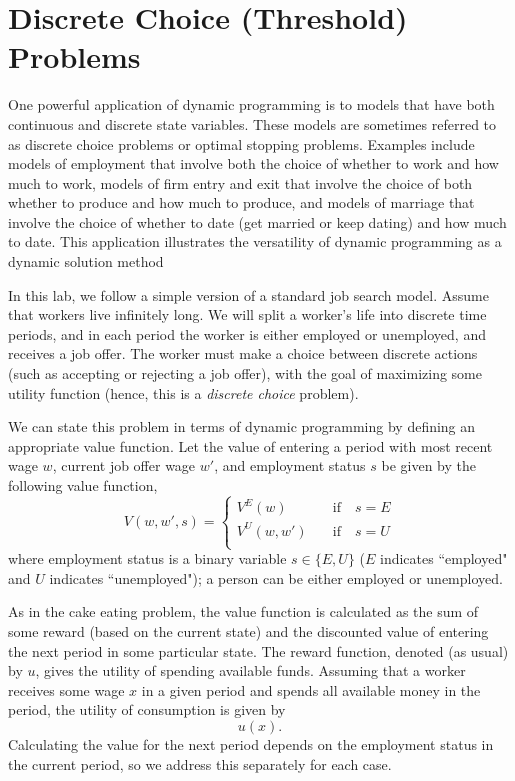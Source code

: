\section*{Discrete Choice (Threshold) Problems}\label{SecDiscrChoice}

One powerful application of dynamic programming is
to models that have both continuous and discrete state variables. These models are sometimes referred to as
discrete choice problems or optimal stopping problems.  Examples include models of employment that involve both
the choice of whether to work and how much to work, models of firm entry and exit that involve the choice of both
whether to produce and how much to produce, and models of marriage that involve the choice of whether to date
(get married or keep dating) and how much to date.
This application illustrates the versatility of dynamic programming as a dynamic solution method

In this lab, we follow a simple version of a standard job search model.
Assume that workers live infinitely long.
We will split a worker's life into discrete time periods, and in each period the worker is either
employed or unemployed, and receives a job offer. The worker must make a choice between discrete actions
(such as accepting or rejecting a job offer), with the goal of maximizing some utility function (hence,
this is a \emph{discrete choice} problem).

We can state this problem in terms of dynamic programming by defining an appropriate value function.
Let the value of entering a period with most recent wage $w$,
current job offer wage $w'$, and employment status $s$ be given by the following value function,
\begin{equation}\label{EqV}
   V(w,w',s) = \begin{cases}
                  V^E(w)    \quad&\text{if}\quad s = E \\
                  V^U(w,w') \quad&\text{if}\quad s = U \\
               \end{cases}
\end{equation}
where employment status is a binary variable $s\in\{E,U\}$ ($E$ indicates ``employed" and $U$ indicates ``unemployed");
a person can be either employed or unemployed.

As in the cake eating problem, the value function is calculated as the sum of some reward (based on the
current state) and the discounted value of entering the next period in some particular state.
The reward function, denoted (as usual) by $u$, gives the utility of spending available funds.
Assuming that a worker receives some wage $x$ in a given period and spends all available money in the period,
the utility of consumption is given by
\[
u(x).
\]
Calculating the value for the next period depends on the employment status in the current period, so we address
this separately for each case.

